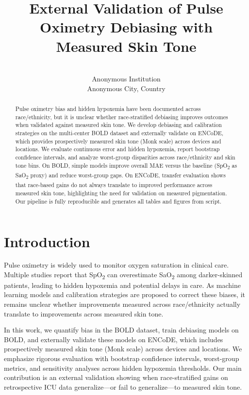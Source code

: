 \documentclass[pmlr]{jmlr}%
\title[Pulse Oximetry Bias]{External Validation of Pulse Oximetry Debiasing with Measured Skin Tone}
\author{\Name{Anonymous Author(s)}
       \Email{anonymous@domain.edu}\\
       \addr Anonymous Institution\\
       Anonymous City, Country}
\begin{document}
\maketitle

\begin{abstract}
Pulse oximetry bias and hidden hypoxemia have been documented across race/ethnicity, but it is unclear whether race-stratified debiasing improves outcomes when validated against measured skin tone. We develop debiasing and calibration strategies on the multi-center BOLD dataset and externally validate on ENCoDE, which provides prospectively measured skin tone (Monk scale) across devices and locations. We evaluate continuous error and hidden hypoxemia, report bootstrap confidence intervals, and analyze worst-group disparities across race/ethnicity and skin tone bins. On BOLD, simple models improve overall MAE versus the baseline (SpO\textsubscript{2} as SaO\textsubscript{2} proxy) and reduce worst-group gaps. On ENCoDE, transfer evaluation shows that race-based gains do not always translate to improved performance across measured skin tone, highlighting the need for validation on measured pigmentation. Our pipeline is fully reproducible and generates all tables and figures from script.
\end{abstract}

\section{Introduction}

Pulse oximetry is widely used to monitor oxygen saturation in clinical care. Multiple studies report that SpO\textsubscript{2} can overestimate SaO\textsubscript{2} among darker-skinned patients, leading to hidden hypoxemia and potential delays in care. As machine learning models and calibration strategies are proposed to correct these biases, it remains unclear whether improvements measured across race/ethnicity actually translate to improvements across measured skin tone\cite{pulseox-bias,hidden-hypoxemia,skin-tone-metrics}.

In this work, we quantify bias in the BOLD dataset, train debiasing models on BOLD, and externally validate these models on ENCoDE, which includes prospectively measured skin tone (Monk scale) across devices and locations. We emphasize rigorous evaluation with bootstrap confidence intervals, worst-group metrics, and sensitivity analyses across hidden hypoxemia thresholds. Our main contribution is an external validation showing when race-stratified gains on retrospective ICU data generalize---or fail to generalize---to measured skin tone.
\end{document}
